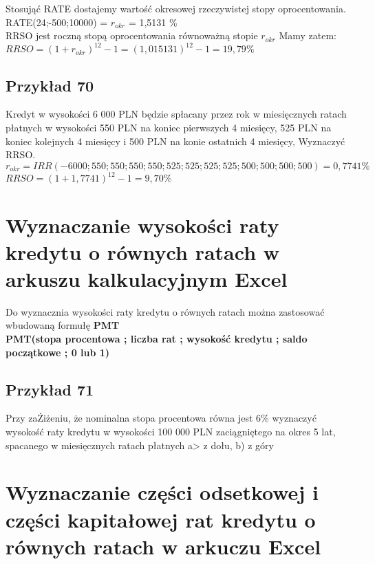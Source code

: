 \documentclass{article}
\begin{document}
Stosująć RATE dostajemy wartość okresowej rzeczywistej stopy oprocentowania. \\

RATE(24;-500;10000) = $ r_{okr} $ = 1,5131 \% \\

RRSO jest roczną stopą oprocentowania równoważną stopie $ r_{okr} $ Mamy zatem: $ RRSO = (1 + r_{okr})^{12} - 1 = (1,015131)^{12} - 1 = 19,79 \% $

\subsection{Przykład 70}

Kredyt w wysokości 6 000 PLN będzie spłacany przez rok w miesięcznych ratach płatnych w wysokości 550 PLN na koniec pierwszych 4 miesięcy, 525 PLN na koniec kolejnych 4 miesięcy i 500 PLN na konie ostatnich 4 miesięcy, Wyznaczyć RRSO.\\

$ r_{okr} = IRR(-6000;550;550;550;550;525;525;525;525;500;500;500;500) = 0,7741 \% $\\

$ RRSO = (1 + 1,7741)^{12} - 1 = 9,70 \% $

\newpage

\section{Wyznaczanie wysokości raty kredytu o równych ratach w arkuszu kalkulacyjnym Excel}

Do wyznacznia wysokości raty kredytu o równych ratach można zastosować wbudowaną formułę \textbf{PMT}\\

\textbf{PMT(stopa procentowa ; liczba rat ; wysokość kredytu ; saldo początkowe ; 0 lub 1)}\\

\subsection{Przykład 71}
Przy zaŻiżeniu, że nominalna stopa procentowa równa jest 6\% wyznaczyć wysokość raty kredytu w wysokości 100 000 PLN zaciągniętego na okres 5 lat, spacanego w miesięcznych ratach płatnych a> z dołu, b) z góry\\

\newpage

\section{Wyznaczanie części odsetkowej i części kapitałowej rat kredytu o równych ratach w arkuczu Excel}
\end{document}
